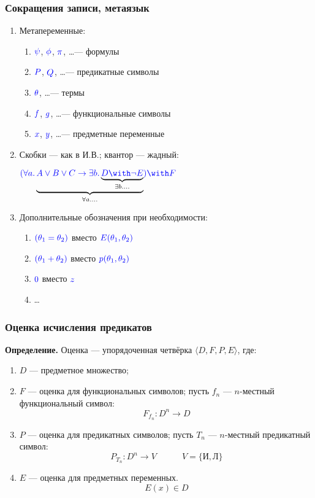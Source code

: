 \documentclass[10pt,a4paper,oneside]{article}
\begin{document}
\subsubsection{Сокращения записи, метаязык}

\begin{enumerate}
\item Метапеременные:
\begin{enumerate}
\item $\color{blue}\psi$, $\color{blue}\phi$, $\color{blue}\pi$, \dots --- формулы
\item $\color{blue}P$, $\color{blue}Q$, \dots --- предикатные символы
\item $\color{blue}\theta$, \dots --- термы
\item $\color{blue}f$, $\color{blue}g$, \dots --- функциональные символы
\item $\color{blue}x$, $\color{blue}y$, \dots --- предметные переменные
\end{enumerate}

\item Скобки --- как в И.В.; квантор --- жадный:
\begin{center}${\color{blue}(\forall a.} \underbrace{{\color{blue}A \vee B \vee C \rightarrow \exists b.}
                    \underbrace{\color{blue}D \with \neg E}_{\exists b.\dots}}_{\forall a.\dots} \color{blue}) \with F$\end{center}

\item Дополнительные обозначения при необходимости:
\begin{enumerate}
\item $\color{blue}(\theta_1 = \theta_2)$ вместо $\color{blue}E(\theta_1,\theta_2)$
\item $\color{blue}(\theta_1 + \theta_2)$ вместо $\color{blue}p(\theta_1,\theta_2)$
\item $\color{blue}0$ вместо $\color{blue}z$
\item \dots
\end{enumerate}

\end{enumerate}

\subsubsection{Оценка исчисления предикатов}
{\bf Определение.} Оценка --- упорядоченная четвёрка $\langle D, F, P, E \rangle$, где:

\begin{enumerate}
\item $D$ --- предметное множество;
\item $F$ --- оценка для функциональных символов; пусть $f_n$ --- $n$-местный функциональный символ:
 $$F_{f_n}: D^n \rightarrow D$$

\item $P$ --- оценка для предикатных символов; пусть $T_n$ --- $n$-местный предикатный символ:
 $$P_{T_n}: D^n \rightarrow V\quad\quad\quad V = \{\text{И}, \text{Л}\}$$

\item $E$ --- оценка для предметных переменных.
 $$E(x) \in D$$
\end{enumerate}
\end{document}

